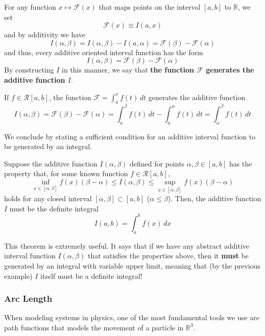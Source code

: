 \documentclass{article}
\begin{document}
      \begin{lemma}
        For any function $x \mapsto \mathcal{F}(x)$ that maps points on the interval $[a, b]$ to $\mathbb{R}$, we set
        \[\mathcal{F}(x) \equiv I(a, x)\]
        and by additivity we have
        \[I(\alpha, \beta) = I(\alpha, \beta) - I(a, \alpha) = \mathcal{F}(\beta) - \mathcal{F}(\alpha)\]
        and thus, every additive oriented interval function has the form 
        \[I(\alpha, \beta) = \mathcal{F}(\beta) - \mathcal{F}(\alpha)\]
        By constructing $I$ in this manner, we say that \textbf{the function $\mathcal{F}$ generates the additive function $I$}. 
      \end{lemma}

    \begin{example}
    If $f \in \mathcal{R}[a, b]$, the function $\mathcal{F} = \int_a^x f(t)\,dt$ generates the additive function
    \[I(\alpha, \beta) = \mathcal{F}(\beta) - \mathcal{F}(\alpha) = \int_a^\beta f(t)\,dt - \int_a^\alpha f(t)\,dt = \int_\alpha^\beta f(t)\,dt\]
    \end{example}

      We conclude by stating a sufficient condition for an additive interval function to be generated by an integral. 
      \begin{theorem}
      Suppose the additive function $I(\alpha, \beta)$ defined for points $\alpha, \beta \in [a, b]$ has the property that, for some known function $f \in \mathcal{R}[a, b]$, 
      \[\inf_{x \in [\alpha, \beta]} f(x) (\beta - \alpha) \leq I(\alpha, \beta) \leq \sup_{x \in [\alpha, \beta]} f(x) (\beta - \alpha)\]
      holds for any closed interval $[\alpha, \beta] \subset [a, b]$ ($\alpha \leq \beta$). Then, the additive function $I$ must be the definite integral
      \[I(a, b) = \int_a^b f(x)\,dx\]
      \end{theorem}

      This theorem is extremely useful. It says that if we have any abstract additive interval function $I(\alpha, \beta)$ that satisfies the properties above, then it \textbf{must} be generated by an integral with variable upper limit, meaning that (by the previous example) $I$ itself must be a definite integral! 

      \subsubsection{Arc Length}
      When modeling systems in physics, one of the most fundamental tools we use are path functions that models the movement of a particle in $\mathbb{R}^3$. 
\end{document}
